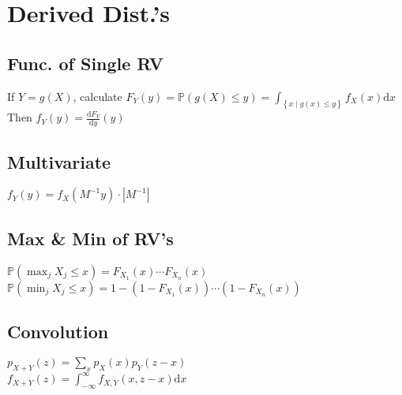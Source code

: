 \section{Derived Dist.'s}

	\subsection*{Func. of Single RV}
	If $Y = g(X)$, calculate $F_{Y}\left(y\right) = \mathbb{P}\left(g\left(X\right)\leq y\right) = \int_{\left\{x\mid g(x)\leq y\right\}}\!f_{X}\left(x\right)\mathrm{d}x$\\
	Then $f_{Y}\left(y\right) = \frac{\mathrm{d}F_{Y}}{\mathrm{d}y}\left(y\right)$
	
	\subsection*{Multivariate}
	$f_{Y}\left(y\right) = f_{X}\left(M^{-1}y\right)\cdot\left|M^{-1}\right|$
	
	\subsection*{Max \& Min of RV's}
	$\mathbb{P}\left(\max_{j}X_{j}\leq x\right) = F_{X_{1}}\left(x\right)\cdots F_{X_{n}}\left(x\right)$\\
	$\mathbb{P}\left(\min_{j}X_{j}\leq x\right) = 1 - \left(1 - F_{X_{1}}\left(x\right)\right)\cdots\left(1 - F_{X_{n}}\left(x\right)\right)$
	
	\subsection*{Convolution}
	$p_{X + Y}\left(z\right) = \sum_{x}p_{X}\left(x\right)p_{Y}\left(z - x\right)$\\
	$f_{X+Y}\left(z\right) = \int_{-\infty}^{\infty}\!f_{X,Y}\left(x,z-x\right)\mathrm{d}x$
	